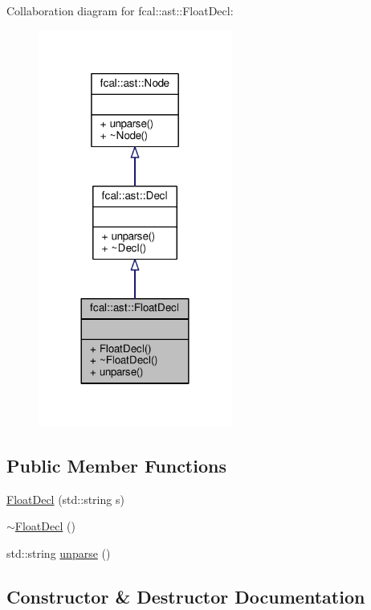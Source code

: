 Collaboration diagram for fcal\+:\+:ast\+:\+:Float\+Decl\+:
\nopagebreak
\begin{figure}[H]
\begin{center}
\leavevmode
\includegraphics[width=180pt]{classfcal_1_1ast_1_1FloatDecl__coll__graph}
\end{center}
\end{figure}
\subsection*{Public Member Functions}
\begin{DoxyCompactItemize}
\item 
\hyperlink{classfcal_1_1ast_1_1FloatDecl_a125ca270dfa2c429ec03e08fff943fcc}{Float\+Decl} (std\+::string s)
\item 
\hyperlink{classfcal_1_1ast_1_1FloatDecl_a108cfa0009c375c3a204a9b96bc9f413}{$\sim$\+Float\+Decl} ()
\item 
std\+::string \hyperlink{classfcal_1_1ast_1_1FloatDecl_af2eeeb25426c98315fdb7926e16211a9}{unparse} ()
\end{DoxyCompactItemize}


\subsection{Constructor \& Destructor Documentation}
